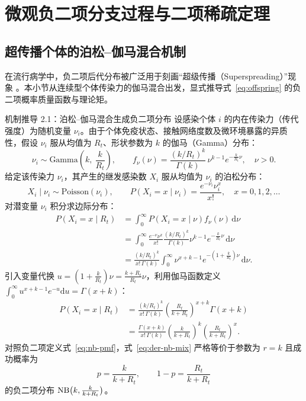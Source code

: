 \section{微观负二项分支过程与二项稀疏定理}
\label{sec:part02}

\subsection{超传播个体的泊松--伽马混合机制}

在流行病学中，负二项后代分布被广泛用于刻画“超级传播（Superspreading）”现象 \citep{lloydsmith2005superspreading}。本小节从连续型个体传染力的伽马混合出发，显式推导式~\eqref{eq:offspring} 的负二项概率质量函数与理论矩。

\begin{derivationbox}{机制推导 2.1：泊松--伽马混合生成负二项分布}
设感染个体 $i$ 的内在传染力（传代强度）为随机变量 $\nu_i$。由于个体免疫状态、接触网络度数及微环境暴露的异质性，假设 $\nu_i$ 服从均值为 $R_t$、形状参数为 $k$ 的伽马（Gamma）分布：
\begin{equation}
  \nu_i \sim \text{Gamma}\!\left(k,\ \frac{k}{R_t}\right), \qquad f_{\nu}(\nu) = \frac{(k/R_t)^k}{\Gamma(k)} \, \nu^{k-1} e^{-\frac{k}{R_t}\nu}, \quad \nu > 0.
\end{equation}
给定该传染力 $\nu_i$，其产生的继发感染数 $X_i$ 服从均值为 $\nu_i$ 的泊松分布：
\begin{equation}
  X_i \mid \nu_i \sim \text{Poisson}(\nu_i), \qquad P(X_i = x \mid \nu_i) = \frac{e^{-\nu_i} \nu_i^x}{x!}, \quad x = 0, 1, 2, \dots
\end{equation}
对潜变量 $\nu_i$ 积分求边际分布：
\begin{align}
  P(X_i = x \mid R_t) &= \int_0^\infty P(X_i = x \mid \nu) f_\nu(\nu) \, \mathrm{d}\nu \nonumber \\
  &= \int_0^\infty \frac{e^{-\nu} \nu^x}{x!} \frac{(k/R_t)^k}{\Gamma(k)} \nu^{k-1} e^{-\frac{k}{R_t}\nu} \, \mathrm{d}\nu \nonumber \\
  &= \frac{(k/R_t)^k}{x! \, \Gamma(k)} \int_0^\infty \nu^{x+k-1} e^{-\left(1 + \frac{k}{R_t}\right)\nu} \, \mathrm{d}\nu.
\end{align}
引入变量代换 $u = \left(1 + \frac{k}{R_t}\right)\nu = \frac{k+R_t}{R_t}\nu$，利用伽马函数定义 $\int_0^\infty u^{x+k-1} e^{-u} \mathrm{d}u = \Gamma(x+k)$：
\begin{align}
  P(X_i = x \mid R_t) &= \frac{(k/R_t)^k}{x! \, \Gamma(k)} \left( \frac{R_t}{k+R_t} \right)^{x+k} \Gamma(x+k) \nonumber \\
  &= \frac{\Gamma(x+k)}{x! \, \Gamma(k)} \left( \frac{k}{k+R_t} \right)^k \left( \frac{R_t}{k+R_t} \right)^x.
  \label{eq:der-nb-mix}
\end{align}
对照负二项定义式~\eqref{eq:nb-pmf}，式~\eqref{eq:der-nb-mix} 严格等价于参数为 $r = k$ 且成功概率为
\begin{equation}
  p = \frac{k}{k+R_t}, \qquad 1 - p = \frac{R_t}{k+R_t}
\end{equation}
的负二项分布 $\mathrm{NB}\big(k, \frac{k}{k+R_t}\big)$。
\end{derivationbox}

